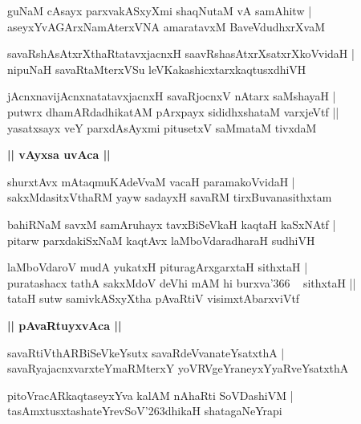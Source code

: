 \documentclass[twoside,12pt,openright]{book}
\def\S{\char'263}
\newcounter{shloka}[chapter]
\def\uvaca#1{\centerline{{\large\textbf{#1}}}}
\begin{document}
\begin{shloka}%
guNaM cAsayx parxvakASxyXmi shaqNutaM vA samAhitw |\\
aseyxYvAGArxNamAterxVNA amaratavxM BaveVdudhxrXvaM 
\end{shloka}

\begin{shloka}%
savaRshAsAtxrXthaRtatavxjacnxH saavRshasAtxrXsatxrXkoVvidaH |\\
nipuNaH savaRtaMterxVSu leVKakashicxtarxkaqtusxdhiVH 
\end{shloka}

\begin{shloka}%
jAcnxnavijAcnxnatatavxjacnxH savaRjocnxV nAtarx saMshayaH |\\
putwrx dhamARdadhikatAM pArxpayx sididhxshataM varxjeVtf ||\\
yasatxsayx veY parxdAsAyxmi pitusetxV saMmataM tivxdaM 
\end{shloka}

\uvaca{|| vAyxsa uvAca ||}

\begin{shloka}%
shurxtAvx mAtaqmuKAdeVvaM vacaH paramakoVvidaH |\\
sakxMdasitxVthaRM yayw sadayxH savaRM tirxBuvanasithxtam 
\end{shloka}

\begin{shloka}%
bahiRNaM savxM samAruhayx tavxBiSeVkaH kaqtaH kaSxNAtf |\\
pitarw parxdakiSxNaM kaqtAvx laMboVdaradharaH sudhiVH 
\end{shloka}

\begin{shloka}%
laMboVdaroV mudA yukatxH pituragArxgarxtaH sithxtaH |\\
puratashacx tathA sakxMdoV deVhi mAM hi burxva\char'366 ~ sithxtaH ||\\
tataH sutw samivkASxyXtha pAvaRtiV visimxtAbarxviVtf
\end{shloka}

\uvaca{|| pAvaRtuyxvAca ||}

\begin{shloka}%
savaRtiVthARBiSeVkeYsutx savaRdeVvanateYsatxthA |\\
savaRyajacnxvarxteYmaRMterxY yoVRVgeYraneyxYyaRveYsatxthA 
\end{shloka}

\begin{shloka}%
pitoVracARkaqtaseyxYva kalAM nAhaRti SoVDashiVM |\\
tasAmxtusxtashateYrevSoV\S dhikaH shatagaNeYrapi
\end{shloka}
\end{document}
